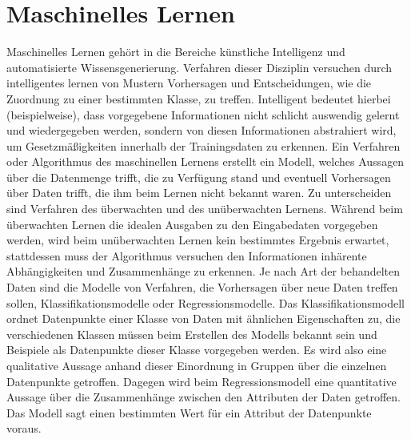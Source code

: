 \documentclass[
	12pt,
	a4paper,
	BCOR10mm,
	DIV14,
	listof=totoc,
	bibliography=totoc,
	headsepline
]{scrreprt}
\begin{document}


\section{Maschinelles Lernen}
\label{ML}
Maschinelles Lernen gehört in die Bereiche künstliche Intelligenz und automatisierte Wissensgenerierung. Verfahren dieser Disziplin versuchen durch intelligentes lernen von Mustern Vorhersagen und Entscheidungen, wie die Zuordnung zu einer bestimmten Klasse, zu treffen. Intelligent bedeutet hierbei (beispielweise), dass vorgegebene Informationen nicht schlicht auswendig gelernt und wiedergegeben werden, sondern von diesen Informationen abstrahiert wird, um Gesetzmäßigkeiten innerhalb der Trainingsdaten zu erkennen. Ein Verfahren oder Algorithmus des maschinellen Lernens erstellt ein Modell, welches Aussagen über die Datenmenge trifft, die zu Verfügung stand und eventuell Vorhersagen über Daten trifft, die ihm beim Lernen nicht bekannt waren. 
Zu unterscheiden sind Verfahren des überwachten und des unüberwachten Lernens. Während beim überwachten Lernen die idealen Ausgaben zu den Eingabedaten vorgegeben werden, wird beim unüberwachten Lernen kein bestimmtes Ergebnis erwartet, stattdessen muss der Algorithmus versuchen den Informationen inhärente Abhängigkeiten und Zusammenhänge zu erkennen.
Je nach Art der behandelten Daten sind die Modelle von Verfahren, die Vorhersagen über neue Daten treffen sollen, Klassifikationsmodelle oder Regressionsmodelle. Das Klassifikationsmodell ordnet Datenpunkte einer Klasse von Daten mit ähnlichen Eigenschaften zu, die verschiedenen Klassen müssen beim Erstellen des Modells bekannt sein und Beispiele als Datenpunkte dieser Klasse vorgegeben werden. Es wird also eine qualitative Aussage anhand dieser Einordnung in Gruppen über die einzelnen Datenpunkte getroffen. Dagegen wird beim Regressionsmodell eine quantitative Aussage über die Zusammenhänge zwischen den Attributen der Daten getroffen. Das Modell sagt einen bestimmten Wert für ein Attribut der Datenpunkte voraus.  
\end{document}
